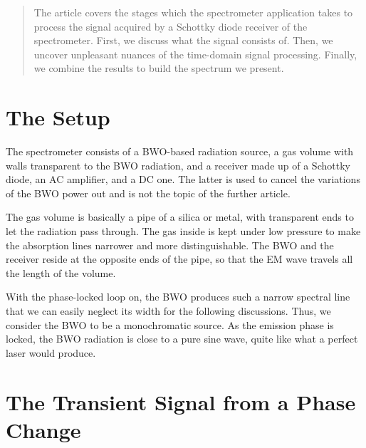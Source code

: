 \documentclass[a4paper]{article}
\begin{document}
\maketitle

\begin{abstract}
The article covers the stages which the spectrometer application takes to process the signal acquired by a Schottky diode receiver of the spectrometer. First, we discuss what the signal consists of. Then, we uncover unpleasant nuances of the time-domain signal processing. Finally, we combine the results to build the spectrum we present.
\end{abstract}

\section{The Setup}\label{sec:The Setup}

The spectrometer consists of a BWO-based radiation source, a gas volume with walls transparent to the BWO radiation, and a receiver made up of a Schottky diode, an AC amplifier, and a DC one. The latter is used to cancel the variations of the BWO power out and is not the topic of the further article.

The gas volume is basically a pipe of a silica or metal, with transparent ends to let the radiation pass through. The gas inside is kept under low pressure to make the absorption lines narrower and more distinguishable. The BWO and the receiver reside at the opposite ends of the pipe, so that the EM wave travels all the length of the volume.

With the phase-locked loop on, the BWO produces such a narrow spectral line that we can easily neglect its width for the following discussions. Thus, we consider the BWO to be a monochromatic source. As the emission phase is locked, the BWO radiation is close to a pure sine wave, quite like what a perfect laser would produce.

\section{The Transient Signal from a Phase Change}\label{sec:The Transient Signal from a Phase Change}
\end{document}
